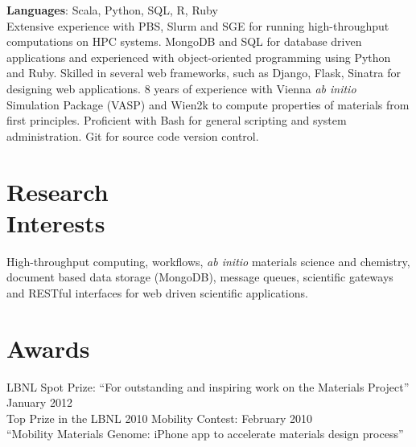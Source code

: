 \documentclass[margin,line]{resume}
\begin{document}
\begin{resume}
    \textbf{Languages}: Scala, Python, SQL, R, Ruby\vspace{2mm}\\
                Extensive experience with PBS, Slurm and SGE for running high-throughput
                computations on HPC systems. MongoDB and SQL for database driven
                applications and experienced with object-oriented programming using
                Python and Ruby. Skilled in several web frameworks, such as Django, Flask, Sinatra for designing web
                applications. 8 years of experience with Vienna
                \textsl{ab initio} Simulation Package (VASP) and Wien2k to compute properties of materials from first principles. Proficient with Bash for general scripting and system administration. Git for source code version control.




    \section{\mysidestyle Research\\Interests}

    High-throughput computing, workflows, \textsl{ab initio} materials science
    and chemistry, document based data storage (MongoDB), message queues, scientific gateways and RESTful interfaces for web driven scientific applications.


    \section{\mysidestyle Awards}
    LBNL Spot Prize: ``For outstanding and inspiring
      work on the Materials Project'' \hfill January 2012\vspace{2mm}\\
    Top Prize in the LBNL 2010 Mobility Contest: \hfill February 2010\\
      ``Mobility Materials Genome: iPhone app to
       accelerate materials design process''

    

\end{resume}
\end{document}
